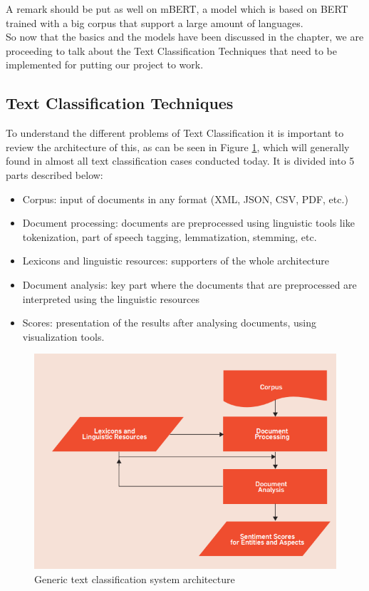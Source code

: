 A remark should be put as well on mBERT, a model which is based on BERT trained with a big corpus that support a large amount of languages. \\

So now that the basics and the models have been discussed in the chapter, we are proceeding to talk about the Text Classification Techniques that need to be implemented for putting our project to work.
\subsection{Text Classification Techniques}

To understand the different problems of Text Classification it is important to review the architecture of this, as can be seen in Figure \ref{fig:text-clasification-architecture}, which will generally found in almost all text classification cases conducted today. It is divided into 5 parts described below:


\begin{itemize}
    \item Corpus: input of documents in any format (XML, JSON, CSV, PDF, etc.)
    \item Document processing: documents are preprocessed using linguistic tools like tokenization, part of speech tagging, lemmatization, stemming, etc.
    \item Lexicons and linguistic resources: supporters of the whole architecture
    \item Document analysis: key part where the documents that are preprocessed are interpreted using the linguistic resources
    \item Scores: presentation of the results after analysing documents, using visualization tools.
\end{itemize}


\begin{figure}[!htp]
    \centering
    \includegraphics[scale=0.75]{img/state-of-art/text-classification-architecture.png}

    \caption{Generic text classification system architecture~\cite{feldman2013techniques}}
    \label{fig:text-clasification-architecture}
\end{figure}

